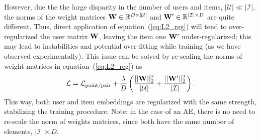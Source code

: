 However, due the the large disparity in the number of users and items, $|\mathcal{U}|\ll |\mathcal{I}|$, the norms of the weight matrices ${\bf W}\in\mathbb{R}^{D\times|\mathcal{U}|}$ and ${\bf W'}\in\mathbb{R}^{|\mathcal{I}|\times D}$ are quite different. Thus, direct application of equation~(\ref{eq:L2_reg}) will tend to over-regularized the user matrix ${\bf W}$, leaving the item one ${\bf W'}$ under-regularized; this may lead to instabilities and potential over-fitting while training (as we have observed experimentally). This issue can be solved by re-scaling the norms of weight matrices in equation~(\ref{eq:L2_reg}) as
\begin{equation}\label{eq:l2_reg_scaled}
\mathcal{L} = \mathcal{L}_{\rm point/pair}+\frac{\lambda}{D}\left( 
\frac{||{\bf W}||_2^2}{|\mathcal{U}|}+
 \frac{||{\bf W'}||_2^2}{|\mathcal{I}|}
\right).    
\end{equation}
This way, both user and item embeddings are regularized with the same strength, stabilizing the training procedure. Note: in the case of an AE, there is no need to re-scale the norm of weights matrices, since both have the same number of elements, $|\mathcal{I}|\times D$. 
